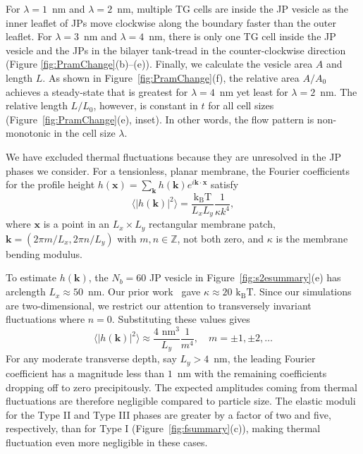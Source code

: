 \documentclass[prb,preprint,showpacs,preprintnumbers,amsmath,amssymb,longbibliography]{revtex4-2}
\newcommand{\kk}{\mathbf{k}}
\newcommand{\xx}{\mathbf{x}}
\newcommand{\kbt}{\mathrm{k}_{\text{B}}\mathrm{T}}
\begin{document}
For $\lambda=1$~nm and $\lambda=2$~nm, multiple TG cells are inside the
JP vesicle as the inner leaflet of JPs move clockwise along the boundary
faster than the outer leaflet. For $\lambda=3$~nm and $\lambda=4$~nm,
there is only one TG cell inside the JP vesicle and the JPs in the
bilayer tank-tread in the counter-clockwise direction (Figure
\ref{fig:PramChange}(b)--(e)). 
%
Finally, we calculate the vesicle area $A$ and length $L$. As shown in
Figure~\ref{fig:PramChange}(f), the relative area $A/A_0$ achieves a
steady-state that is greatest for $\lambda = 4$~nm yet least for
$\lambda = 2$~nm. The relative length $L/L_0$, however, is constant in
$t$ for all cell sizes (Figure~\ref{fig:PramChange}(e), inset). In other
words, the flow pattern is non-monotonic in the cell size $\lambda$.

We have excluded thermal fluctuations because they are unresolved in the
JP phases we consider. For a tensionless, planar membrane, the Fourier
coefficients for the profile height $h(\xx) = \sum_{\kk} h(\kk)e^{i \kk
\cdot \xx}$ satisfy~\cite{Merath2006FluctuationSO}
\begin{equation}
\label{eq:fourier_spectrum}
\langle |h(\kk)|^2 \rangle = \frac{\kbt}{L_xL_y}\frac{1}{\kappa k^4},
\end{equation}
where $\xx$ is a point in an $L_x \times L_y$ rectangular membrane
patch, $\kk = \left(2\pi m/L_x, 2\pi n/L_y\right)$ with $m,n \in
\mathbb{Z}$, not both zero, and $\kappa$ is the membrane bending
modulus.

To estimate $h(\kk)$, the $N_b = 60$ JP vesicle in
Figure~\ref{fig:s2esummary}(e) has arclength $L_x \approx 50$~nm. Our
prior work~\cite{Fu20,Fu2022_JFM} gave $\kappa \approx 20$ $\kbt$. Since
our simulations are two-dimensional, we restrict our attention to
transversely invariant fluctuations where $n = 0$. Substituting these
values gives 
\begin{equation}
\label{eq:fourier_spectrum_upper}
\langle |h(\kk)|^2 \rangle \approx \frac{4 \text{ nm}^3}{L_y}\frac{1}{m^4}, \quad m = \pm 1, \pm 2, \dots
\end{equation}
For any moderate transverse depth, say $L_y > 4$~nm, the leading Fourier
coefficient has a magnitude less than $1$~nm with the remaining
coefficients dropping off to zero precipitously. The expected amplitudes
coming from thermal fluctuations are therefore negligible compared to
particle size. The elastic moduli for the Type II and Type III phases
are greater by a factor of two and five, respectively, than for Type I
(Figure~\ref{fig:fsummary}(c)), making thermal fluctuation even more
negligible in these cases.
\end{document}
